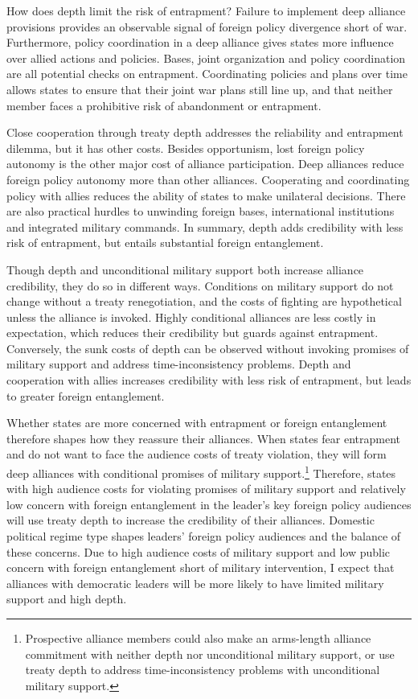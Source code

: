 \documentclass[12pt]{article}
\begin{document}
How does depth limit the risk of entrapment?   
Failure to implement deep alliance provisions provides an observable signal of foreign policy divergence short of war.
Furthermore, policy coordination in a deep alliance gives states more influence over allied actions and policies. 
Bases, joint organization and policy coordination are all potential checks on entrapment.
Coordinating policies and plans over time allows states to ensure that their joint war plans still line up, and that neither member faces a prohibitive risk of abandonment or entrapment.  


Close cooperation through treaty depth addresses the reliability and entrapment dilemma, but it has other costs. 
Besides opportunism, lost foreign policy autonomy is the other major cost of alliance participation. 
Deep alliances reduce foreign policy autonomy more than other alliances.
Cooperating and coordinating policy with allies reduces the ability of states to make unilateral decisions. 
There are also practical hurdles to unwinding foreign bases, international institutions and integrated military commands. 
In summary, depth adds credibility with less risk of entrapment, but entails substantial foreign entanglement. 


Though depth and unconditional military support both increase alliance credibility, they do so in different ways. 
Conditions on military support do not change without a treaty renegotiation, and the costs of fighting are hypothetical unless the alliance is invoked.  
Highly conditional alliances are less costly in expectation, which reduces their credibility but guards against entrapment. 
Conversely, the sunk costs of depth can be observed without invoking promises of military support and address time-inconsistency problems.
Depth and cooperation with allies increases credibility with less risk of entrapment, but leads to greater foreign entanglement.   



Whether states are more concerned with entrapment or foreign entanglement therefore shapes how they reassure their alliances. 
When states fear entrapment and do not want to face the audience costs of treaty violation, they will form deep alliances with conditional promises of military support.\footnote{Prospective alliance members could also make an arms-length alliance commitment with neither depth nor unconditional military support, or use treaty depth to address time-inconsistency problems with unconditional military support.}
Therefore, states with high audience costs for violating promises of military support and relatively low concern with foreign entanglement in the leader's key foreign policy audiences will use treaty depth to increase the credibility of their alliances. 
Domestic political regime type shapes leaders' foreign policy audiences and the balance of these concerns.  
Due to high audience costs of military support and low public concern with foreign entanglement short of military intervention, I expect that alliances with democratic leaders will be more likely to have limited military support and high depth. 
\end{document}
